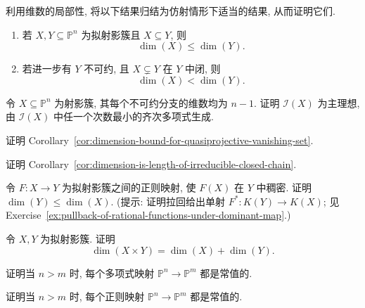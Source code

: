 \BookExerciseHeading
\begin{BookExercises}
  \item\label{ex:quasiprojective-dimension-monotone-and-strict-for-proper-closed-subvariety} 利用维数的局部性, 将以下结果归结为仿射情形下适当的结果, 从而证明它们.
  \begin{enumerate}
    \item 若 $X,Y\subseteq\mathbb{P}^{n}$ 为拟射影簇且 $X\subseteq Y$, 则
    \[
      \dim(X)\le\dim(Y).
    \]
    \item 若进一步有 $Y$ 不可约, 且 $X\subsetneq Y$ 在 $Y$ 中闭, 则
    \[
      \dim(X)<\dim(Y).
    \]
  \end{enumerate}
  \item\label{ex:vanishing-ideal-of-pure-codimension-one-projective-variety-is-principal} 令 $X\subseteq\mathbb{P}^{n}$ 为射影簇, 其每个不可约分支的维数均为 $n-1$. 证明 $\mathcal{I}(X)$ 为主理想, 由 $\mathcal{I}(X)$ 中任一个次数最小的齐次多项式生成.
  \item\label{ex:dimension-bound-for-quasiprojective-vanishing-set} 证明 Corollary~\ref{cor:dimension-bound-for-quasiprojective-vanishing-set}.
  \item\label{ex:dimension-equals-maximal-length-of-chain} 证明 Corollary~\ref{cor:dimension-is-length-of-irreducible-closed-chain}.
  \item\label{ex:dense-image-has-no-larger-dimension-than-domain} 令 $F:X\to Y$ 为拟射影簇之间的正则映射, 使 $F(X)$ 在 $Y$ 中稠密. 证明 $\dim(Y)\le\dim(X)$. (提示: 证明拉回给出单射 $F^{*}:K(Y)\to K(X)$; 见 Exercise~\ref{ex:pullback-of-rational-functions-under-dominant-map}.)
  \item\label{ex:dimension-of-quasiprojective-product} 令 $X,Y$ 为拟射影簇. 证明
  \[
    \dim(X\times Y)=\dim(X)+\dim(Y).
  \]
  \item\label{ex:polynomial-map-from-higher-projective-space-is-constant} 证明当 $n>m$ 时, 每个多项式映射 $\mathbb{P}^{n}\to\mathbb{P}^{m}$ 都是常值的.
  \item\label{ex:regular-map-from-higher-projective-space-is-constant} 证明当 $n>m$ 时, 每个正则映射 $\mathbb{P}^{n}\to\mathbb{P}^{m}$ 都是常值的.
\end{BookExercises}

